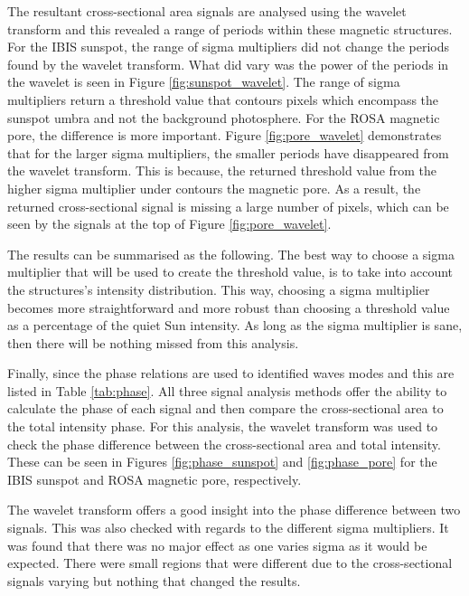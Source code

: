     The resultant cross-sectional area signals are analysed using the wavelet transform and this revealed a range of periods within these magnetic structures.
    For the IBIS sunspot, the range of sigma multipliers did not change the periods found by the wavelet transform.
    What did vary was the power of the periods in the wavelet is seen in Figure \ref{fig:sunspot_wavelet}. 
    The range of sigma multipliers return a threshold value that contours pixels which encompass the sunspot umbra and not the background photosphere.
    For the ROSA magnetic pore, the difference is more important.
    Figure \ref{fig:pore_wavelet} demonstrates that for the larger sigma multipliers, the smaller periods have disappeared from the wavelet transform. 
    This is because, the returned threshold value from the higher sigma multiplier under contours the magnetic pore.
    As a result, the returned cross-sectional signal is missing a large number of pixels, which can be seen by the signals at the top of Figure \ref{fig:pore_wavelet}.
        
    The results can be summarised as the following.
    The best way to choose a sigma multiplier that will be used to create the threshold value, is to take into account the structures's intensity distribution.
    This way, choosing a sigma multiplier becomes more straightforward and more robust than choosing a threshold value as a percentage of the quiet Sun intensity.
    As long as the sigma multiplier is sane, then there will be nothing missed from this analysis.
    
    Finally, since the phase relations are used to identified waves modes and this are listed in Table \ref{tab:phase}.
    All three signal analysis methods offer the ability to calculate the phase of each signal and then compare the cross-sectional area to the total intensity phase.
    For this analysis, the wavelet transform was used to check the phase difference between the cross-sectional area and total intensity.
    These can be seen in Figures \ref{fig:phase_sunspot} and \ref{fig:phase_pore} for the IBIS sunspot and ROSA magnetic pore, respectively.
    
    
    
    The wavelet transform offers a good insight into the phase difference between two signals.
    This was also checked with regards to the different sigma multipliers.
    It was found that there was no major effect as one varies sigma as it would be expected.
    There were small regions that were different due to the cross-sectional signals varying but nothing that changed the results.
    
